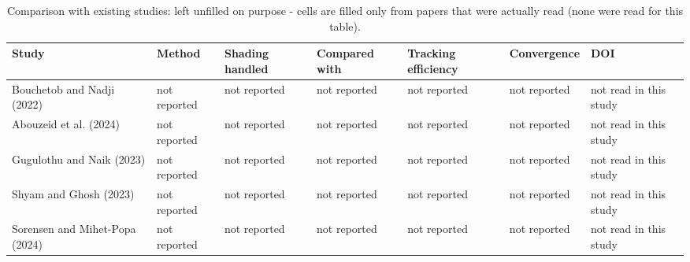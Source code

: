 \begin{table}[t]
\centering
\caption{Comparison with existing studies: left unfilled on purpose - cells are filled only from papers that were actually read (none were read for this table).}
\label{tab:Table_Literature}
\small
\begin{tabular}{lllllll}
\hline
Study & Method & Shading handled & Compared with & Tracking efficiency & Convergence & DOI \\
\hline
Bouchetob and Nadji (2022) & not reported & not reported & not reported & not reported & not reported & not read in this study \\
Abouzeid et al. (2024) & not reported & not reported & not reported & not reported & not reported & not read in this study \\
Gugulothu and Naik (2023) & not reported & not reported & not reported & not reported & not reported & not read in this study \\
Shyam and Ghosh (2023) & not reported & not reported & not reported & not reported & not reported & not read in this study \\
Sorensen and Mihet-Popa (2024) & not reported & not reported & not reported & not reported & not reported & not read in this study \\
\hline
\end{tabular}
\end{table}
